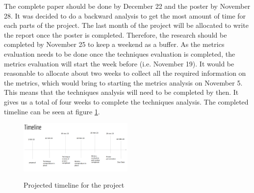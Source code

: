 \documentclass[10pt, conference]{IEEEtran}
\begin{document}
The complete paper should be done by December 22 and the poster by November 28. 
It was decided to do a backward analysis to get the most amount of time for 
each parts of the project.
The last month of the project will be allocated to write the report once the 
poster is completed.
Therefore, the research should be completed by November 25 to keep a weekend 
as a buffer. As the metrics evaluation needs to be done once the techniques evaluation is 
completed, the metrics evaluation will start the week before (i.e. November 19).
It would be reasonable to allocate about two weeks to collect all the required 
information on the metrics, which would bring to starting the metrics analysis 
on November 5. 
This means that the techniques analysis will need to be completed by then.
It gives us a total of four weeks to complete the techniques analysis. The 
completed timeline can be seen at figure \ref{fig:timline}.

\begin{figure}[h]
  \caption{Projected timeline for the project}
  \includegraphics[width=0.5\textwidth]{timeline}
  \label{fig:timline}
\end{figure}

\balance


\end{document}
